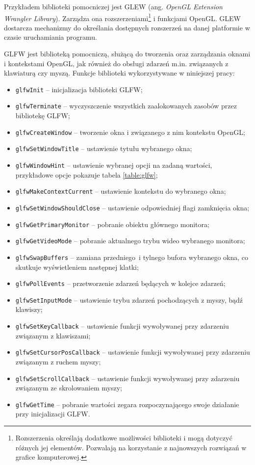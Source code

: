 \documentclass[12pt, twoside, openany]{report}
\begin{document}
Przykładem biblioteki pomocniczej jest GLEW (ang. \textit{OpenGL Extension Wrangler Library}). Zarządza ona rozszerzeniami\footnote{Rozszerzenia określają dodatkowe możliwości biblioteki i mogą dotyczyć różnych jej elementów. Pozwalają na korzystanie z najnowszych rozwiązań w grafice komputerowej.} i funkcjami OpenGL. GLEW dostarcza mechanizmy do określania dostępnych rozszerzeń na danej platformie w czasie uruchamiania programu.




GLFW jest biblioteką pomocniczą, służącą do tworzenia oraz zarządzania oknami i kontekstami OpenGL, jak również do obsługi zdarzeń m.in. związanych z klawiaturą czy myszą. Funkcje biblioteki wykorzystywane w niniejszej pracy:

\begin{itemize}
\item {\texttt{glfwInit} -- inicjalizacja biblioteki GLFW;}
\item {\texttt{glfwTerminate} -- wyczyszczenie wszystkich zaalokowanych zasobów przez bibliotekę GLFW;}
\item {\texttt{glfwCreateWindow} -- tworzenie okna i związanego z nim kontekstu OpenGL;}
\item {\texttt{glfwSetWindowTitle} -- ustawienie tytułu wybranego okna;}
\item {\texttt{glfwWindowHint} -- ustawienie wybranej opcji na zadaną wartości, przykładowe opcje pokazuje tabela \ref{table:glfw};}
\item {\texttt{glfwMakeContextCurrent} -- ustawienie kontekstu do wybranego okna;}
\item {\texttt{glfwSetWindowShouldClose} -- ustawienie odpowiedniej flagi zamknięcia okna;}
\item {\texttt{glfwGetPrimaryMonitor} -- pobranie obiektu głównego monitora;}
\item {\texttt{glfwGetVideoMode} -- pobranie aktualnego trybu wideo wybranego monitora;}
\item {\texttt{glfwSwapBuffers} -- zamiana przedniego~i tylnego bufora wybranego okna, co skutkuje wyświetleniem następnej klatki;}
\item {\texttt{glfwPollEvents} -- przetworzenie zdarzeń będących w kolejce zdarzeń;}
\item {\texttt{glfwSetInputMode} -- ustawienie trybu zdarzeń pochodzących z myszy, bądź klawiszy;}
\item {\texttt{glfwSetKeyCallback} -- ustawienie funkcji wywoływanej przy zdarzeniu związanym z klawiszami;}
\item {\texttt{glfwSetCursorPosCallback} -- ustawienie funkcji wywoływanej przy zdarzeniu związanym z ruchem myszy;}
\item {\texttt{glfwSetScrollCallback} -- ustawienie funkcji wywoływanej przy zdarzeniu związanym ze skrolowaniem myszy;}
\item {\texttt{glfwGetTime} -- pobranie wartości zegara rozpoczynającego swoje działanie przy inicjalizacji GLFW.}
\end{itemize}
\end{document}
